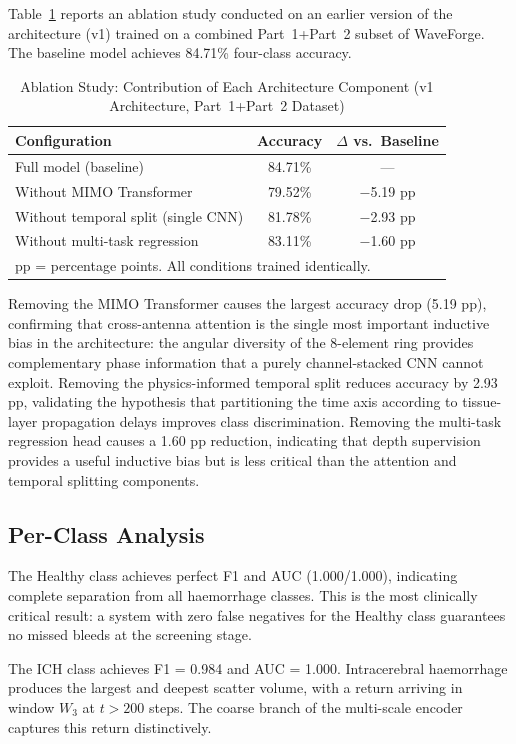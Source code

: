 \documentclass[journal]{IEEEtran}
\begin{document}
Table~\ref{tab:ablation} reports an ablation study conducted
on an earlier version of the architecture (v1) trained on a
combined Part~1+Part~2 subset of WaveForge.  The baseline
model achieves 84.71\% four-class accuracy.

\begin{table}[!t]
\caption{Ablation Study: Contribution of Each Architecture
  Component (v1 Architecture, Part~1+Part~2 Dataset)}
\label{tab:ablation}
\centering
\begin{tabular}{lcc}
\toprule
Configuration & Accuracy & $\Delta$ vs.\ Baseline \\
\midrule
Full model (baseline) & 84.71\% & --- \\
Without MIMO Transformer & 79.52\% & $-$5.19 pp \\
Without temporal split (single CNN) & 81.78\% & $-$2.93 pp \\
Without multi-task regression & 83.11\% & $-$1.60 pp \\
\bottomrule
\multicolumn{3}{l}{\footnotesize pp = percentage points.
  All conditions trained identically.}
\end{tabular}
\end{table}

Removing the MIMO Transformer causes the largest accuracy
drop (5.19 pp), confirming that cross-antenna attention is
the single most important inductive bias in the architecture:
the angular diversity of the 8-element ring provides
complementary phase information that a purely channel-stacked
CNN cannot exploit.  Removing the physics-informed temporal
split reduces accuracy by 2.93 pp, validating the hypothesis
that partitioning the time axis according to tissue-layer
propagation delays improves class discrimination.  Removing
the multi-task regression head causes a 1.60 pp reduction,
indicating that depth supervision provides a useful inductive
bias but is less critical than the attention and temporal
splitting components.

\subsection{Per-Class Analysis}

The Healthy class achieves perfect F1 and AUC (1.000/1.000),
indicating complete separation from all haemorrhage classes.
This is the most clinically critical result: a system with
zero false negatives for the Healthy class guarantees no
missed bleeds at the screening stage.

The ICH class achieves F1 = 0.984 and AUC = 1.000.
Intracerebral haemorrhage produces the largest and deepest
scatter volume, with a return arriving in window $W_3$ at
$t > 200$ steps.  The coarse branch of the multi-scale
encoder captures this return distinctively.
\end{document}
